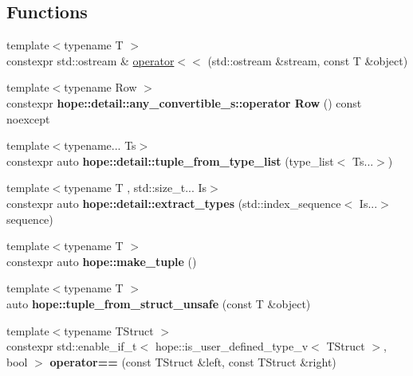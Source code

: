 \subsection*{Functions}
\begin{CompactItemize}
\item 
{\footnotesize template$<$typename T $>$ }\\constexpr std::ostream \& \hyperlink{group__reflection_gbd3ce49df2aedd37c653a40d28c15b2f}{operator$<$$<$} (std::ostream \&stream, const T \&object)
\item 
\hypertarget{group__reflection_g4d776c3dd549e9a3036d34d42a39bbab}{
{\footnotesize template$<$typename Row $>$ }\\constexpr \textbf{hope::detail::any\_\-convertible\_\-s::operator Row} () const noexcept}
\label{group__reflection_g4d776c3dd549e9a3036d34d42a39bbab}

\item 
\hypertarget{group__reflection_g2381b28ca81695f567edca1f161ac9f3}{
{\footnotesize template$<$typename... Ts$>$ }\\constexpr auto \textbf{hope::detail::tuple\_\-from\_\-type\_\-list} (type\_\-list$<$ Ts...$>$)}
\label{group__reflection_g2381b28ca81695f567edca1f161ac9f3}

\item 
\hypertarget{group__reflection_gaee00aac404f7266adcadcbc88e47cbc}{
{\footnotesize template$<$typename T , std::size\_\-t... Is$>$ }\\constexpr auto \textbf{hope::detail::extract\_\-types} (std::index\_\-sequence$<$ Is...$>$ sequence)}
\label{group__reflection_gaee00aac404f7266adcadcbc88e47cbc}

\item 
\hypertarget{group__reflection_gaa379f00d5f74dccf8a4cbe670bd4792}{
{\footnotesize template$<$typename T $>$ }\\constexpr auto \textbf{hope::make\_\-tuple} ()}
\label{group__reflection_gaa379f00d5f74dccf8a4cbe670bd4792}

\item 
\hypertarget{group__reflection_g6c9177e1066ef26d1bbc0bc32c63a444}{
{\footnotesize template$<$typename T $>$ }\\auto \textbf{hope::tuple\_\-from\_\-struct\_\-unsafe} (const T \&object)}
\label{group__reflection_g6c9177e1066ef26d1bbc0bc32c63a444}

\item 
\hypertarget{group__reflection_g43b709ac02e4257375af4304e33eeb40}{
{\footnotesize template$<$typename TStruct $>$ }\\constexpr std::enable\_\-if\_\-t$<$ hope::is\_\-user\_\-defined\_\-type\_\-v$<$ TStruct $>$, bool $>$ \textbf{operator==} (const TStruct \&left, const TStruct \&right)}
\label{group__reflection_g43b709ac02e4257375af4304e33eeb40}

\end{CompactItemize}


